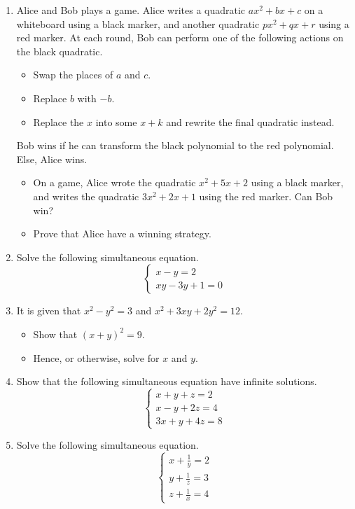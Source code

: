 \documentclass{article}
\newcommand{\prestar}{\vspace*{0.3em}\hspace*{\fill}}
\newcommand{\onestar}{\marginpar{\prestar\textcolor{red}{$\ast$}}}
\begin{document}
\begin{enumerate}
\item \onestar Alice and Bob plays a game. Alice writes a quadratic $ax^2+bx+c$ on a whiteboard using a black marker, and another quadratic $px^2+qx+r$ using a red marker. At each round, Bob can perform one of the following actions on the black quadratic. 
       \begin{itemize}
              \item Swap the places of $a$ and $c$.
              \item Replace $b$ with $-b$.
              \item Replace the $x$ into some $x+k$ and rewrite the final quadratic instead.
       \end{itemize}
Bob wins if he can transform the black polynomial to the red polynomial. Else, Alice wins. 
       \begin{itemize}
              \item[(a)] On a game, Alice wrote the quadratic $x^2+5x+2$ using a black marker, and writes the quadratic $3x^2+2x+1$ using the red marker. Can Bob win?
              \item[(b)] Prove that Alice have a winning strategy.
       \end{itemize}
\item Solve the following simultaneous equation. \[\begin{cases}x-y=2\\ xy-3y+1=0\end{cases}\]
\item It is given that $x^2-y^2=3$ and $x^2+3xy+2y^2=12$.
       \begin{itemize}
              \item[(a)] Show that $(x+y)^2=9$.
              \item[(b)] Hence, or otherwise, solve for $x$ and $y$.
       \end{itemize}
\item Show that the following simultaneous equation have infinite solutions. \[\begin{cases}x+y+z=2\\ x-y+2z=4\\ 3x+y+4z=8\end{cases}\]
\item Solve the following simultaneous equation. \[\begin{cases}x+\frac 1y=2\\ y+\frac 1z=3\\ z+\frac 1x=4\end{cases}\]

\end{enumerate}
\end{document}
